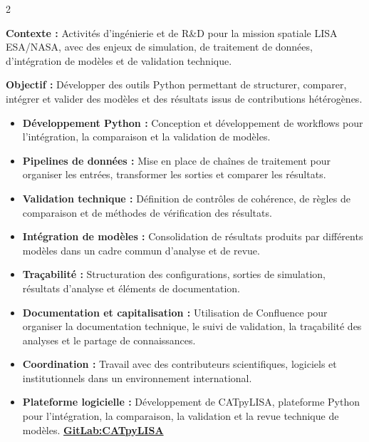 \documentclass[8pt,a4paper,ragged2e,withhyper]{altacv}
\begin{document}
\begin{paracol}{2}
\divider


\textbf{Contexte :} Activités d'ingénierie et de R\&D pour la mission spatiale LISA ESA/NASA, avec des enjeux de simulation, de traitement de données, d'intégration de modèles et de validation technique.

\textbf{Objectif :} Développer des outils Python permettant de structurer, comparer, intégrer et valider des modèles et des résultats issus de contributions hétérogènes.

\begin{itemize}
  \item \textbf{Développement Python :} Conception et développement de workflows pour l'intégration, la comparaison et la validation de modèles.
  \item \textbf{Pipelines de données :} Mise en place de chaînes de traitement pour organiser les entrées, transformer les sorties et comparer les résultats.
  \item \textbf{Validation technique :} Définition de contrôles de cohérence, de règles de comparaison et de méthodes de vérification des résultats.
  \item \textbf{Intégration de modèles :} Consolidation de résultats produits par différents modèles dans un cadre commun d'analyse et de revue.
  \item \textbf{Traçabilité :} Structuration des configurations, sorties de simulation, résultats d'analyse et éléments de documentation.
  \item \textbf{Documentation et capitalisation :} Utilisation de Confluence pour organiser la documentation technique, le suivi de validation, la traçabilité des analyses et le partage de connaissances.
  \item \textbf{Coordination :} Travail avec des contributeurs scientifiques, logiciels et institutionnels dans un environnement international.
  \item \textbf{Plateforme logicielle :} Développement de CATpyLISA, plateforme Python pour l'intégration, la comparaison, la validation et la revue technique de modèles.
  \textcolor{DarkPastelRed}{\href{https://gitlab.oca.eu/gboileau/lisa_l3_tools}{\bf GitLab:CATpyLISA}}
\end{itemize}

\divider



\end{paracol}
\end{document}

